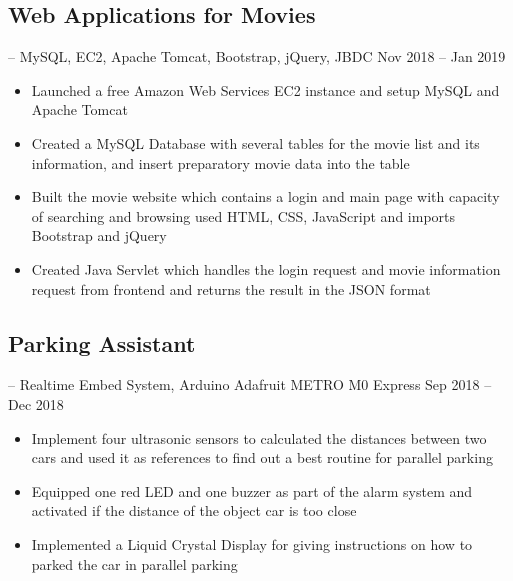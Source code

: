 \documentclass[11pt, letterpaper]{article} %
\begin{document}
\subsection{Web Applications for Movies}
-- MySQL, EC2, Apache Tomcat, Bootstrap, jQuery, JBDC
\hspace*{\fill}Nov 2018 -- Jan 2019
\vspace{-0.8em}
\begin{itemize}
	\setlength\itemsep{-0.5em}
	\item Launched a free Amazon Web Services EC2 instance and setup MySQL and Apache Tomcat
	\item Created a MySQL Database with several tables for the movie list and its information, and insert preparatory movie data into the table
	\item Built the movie website which contains a login and main page with capacity of searching and browsing used HTML, CSS, JavaScript and imports Bootstrap and jQuery
	\item Created Java Servlet which handles the login request and movie information request from frontend and returns the result in the JSON format
\end{itemize}
\vspace{-0.8em}

\subsection{Parking Assistant}
-- Realtime Embed System, Arduino Adafruit METRO M0 Express
\hspace*{\fill}Sep 2018 -- Dec 2018
\vspace{-0.8em}
\begin{itemize}
	\setlength\itemsep{-0.5em}
	\item Implement four ultrasonic sensors to calculated the distances between two cars and used it as references to find out a best routine for parallel parking
	\item Equipped one red LED and one buzzer as part of the alarm system and activated if the distance of the object car is too close
	\item Implemented a Liquid Crystal Display for giving instructions on how to parked the car in parallel parking
\end{itemize}
\vspace{-0.8em}
\end{document}
